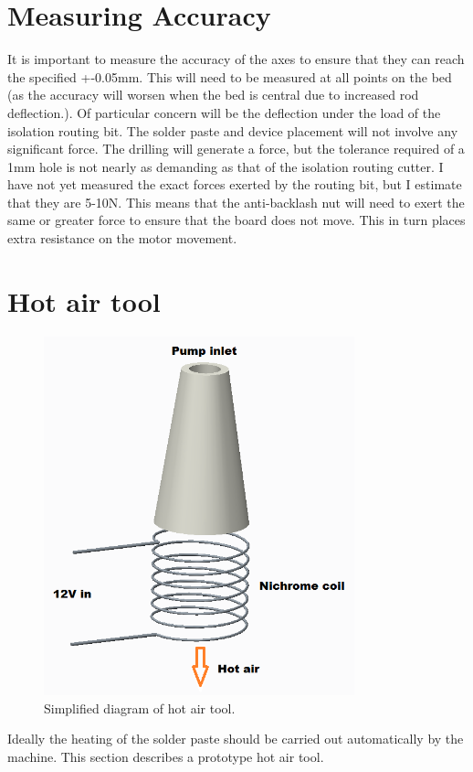 \documentclass[a4paper,11pt]{article}  %
\begin{document}
\section{Measuring Accuracy}
It is important to measure the accuracy of the axes to ensure that they can reach the specified +-0.05mm. This will need to be measured
at all points on the bed (as the accuracy will worsen when the bed is central due to increased rod deflection.). Of particular concern will be
the deflection under the load of the isolation routing bit. The solder paste and device placement will not involve any significant force. The 
drilling will generate a force, but the tolerance required of a 1mm hole is not nearly as demanding as that of the isolation routing cutter.
I have not yet measured the exact forces exerted by the routing bit, but I estimate that they are 5-10N. This means that the anti-backlash nut
will need to exert the same or greater force to ensure that the board does not move. This in turn places extra resistance on the motor movement.

\section{Hot air tool}

\begin{figure}[ht!]
\centering
\includegraphics[width=90mm]{resources/hotair.png}
\caption{Simplified diagram of hot air tool.}
\label{overflow}
\end{figure}

Ideally the heating of the solder paste should be carried out automatically by the machine. This section describes a prototype hot air tool.
\end{document}
